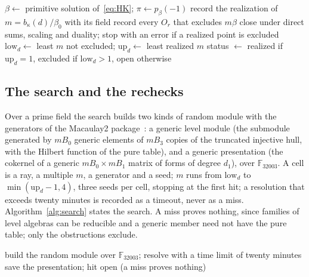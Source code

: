 \documentclass[11pt]{article}
\theoremstyle{definition}
\theoremstyle{remark}
\newcommand{\F}{\mathbb{F}}
\begin{document}
\begin{algorithm}[htbp]
\caption{Census of one ray. Input: $d=(0,d_1,d_2,d_3)$, the multiple bound $12$. Output: $\beta_d$, the parity value, the interval $[\mathrm{low}_d,\mathrm{up}_d]$ for $c_d$ and the status of the primitive point.}
\label{alg:census}
\begin{algorithmic}[1]
\State $\beta\gets$ primitive solution of~\eqref{eq:HK}; $\pi\gets p_\beta(-1)$
  \State record the realization of $m=b_\kappa(d)/\beta_0$ with its field \EndIf
\EndFor
{}\State record every $O_r$ that excludes $m\beta$\EndFor
\State close under direct sums, scaling and duality; stop with an error if a realized point is excluded
\State $\mathrm{low}_d\gets$ least $m$ not excluded; $\mathrm{up}_d\gets$ least realized $m$
\State status $\gets$ realized if $\mathrm{up}_d=1$, excluded if $\mathrm{low}_d>1$, open otherwise
\end{algorithmic}
\end{algorithm}

\subsection{The search and the rechecks}
\label{sec:search}

Over a prime field the search builds two kinds of random module with the generators of the Macaulay2 package~\cite{M2BS}: a generic level module (the submodule generated by $mB_0$ generic elements of $mB_3$ copies of the truncated injective hull, with the Hilbert function of the pure table), and a generic presentation (the cokernel of a generic $mB_0\times mB_1$ matrix of forms of degree $d_1$), over $\F_{32003}$. A cell is a ray, a multiple $m$, a generator and a seed; $m$ runs from $\mathrm{low}_d$ to $\min(\mathrm{up}_d-1,4)$, three seeds per cell, stopping at the first hit; a resolution that exceeds twenty minutes is recorded as a timeout, never as a miss. Algorithm~\ref{alg:search} states the search. A miss proves nothing, since families of level algebras can be reducible and a generic member need not have the pure table; only the obstructions exclude.

\begin{algorithm}[htbp]
\caption{Search on one open ray over $\F_{32003}$. Input: the ray, $\mathrm{low}_d<\mathrm{up}_d$. Output: a hit (an explicit presentation with the pure table $m\beta_d$) or the list of cells tried.}
\label{alg:search}
\begin{algorithmic}[1]
    \State build the random module over $\F_{32003}$; resolve with a time limit of twenty minutes
    \State save the presentation; \Return hit\EndIf
  \EndFor
\EndFor
\State \Return open (a miss proves nothing)
\end{algorithmic}
\end{algorithm}
\end{document}
